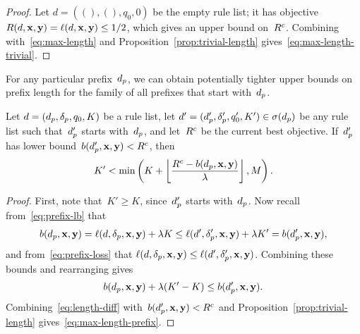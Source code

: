 \begin{arxiv}
\begin{proof}
Let ${d = ((), (), q_0, 0)}$ be the empty rule list;
it has objective ${R({d}, \mathbf{x}, \mathbf{y}) = \ell({d}, \mathbf{x}, \mathbf{y}) \le 1/2}$,
which gives an upper bound on~${R^c}$.
%
Combining with~\eqref{eq:max-length}
and Proposition~\ref{prop:trivial-length}
gives~\eqref{eq:max-length-trivial}.
\end{proof}
\end{arxiv}

For any particular prefix~$d_p$, we can obtain potentially tighter upper bounds on
prefix length for the family of all prefixes that start with~$d_p$.

%

\begin{theorem}
\label{thm:ub-prefix-specific}
Let ${{d} = (d_p, \delta_p, q_0, K)}$ be a rule list, let
${{d}' = (d_p', \delta_p', q_0', K') \in \sigma(d_p)}$
be any rule list such that~$d_p'$ starts with~$d_p$,
and let~${R^c}$ be the current best objective.
%
If~$d_p'$ has lower bound~${b(d_p', \mathbf{x}, \mathbf{y}) < {R^c}}$, then
\begin{align}
K' < \min \left( K + \left\lfloor \frac{\CurrentObj - b(\Prefix, \x, \y)}{\Reg} \right\rfloor, M \right).
\label{eq:max-length-prefix}
\end{align}
\end{theorem}

\begin{arxiv}
\begin{proof}
First, note that~${K' \ge K}$, since~$d_p'$ starts with~$d_p$.
%
Now recall from~\eqref{eq:prefix-lb} that
%
\begin{align}
b(\Prefix, \x, \y) = \Loss(\RL, \Labels, \x, \y) + \Reg K
\le \Loss(\RL', \Labels', \x, \y) + \Reg K' = b(\Prefix', \x, \y),
\end{align}
%
and from~\eqref{eq:prefix-loss} that
${\ell({d}, \delta_p, \mathbf{x}, \mathbf{y}) \le \ell({d}', \delta_p', \mathbf{x}, \mathbf{y})}$.
%
Combining these bounds and rearranging gives
\begin{align}
b(\Prefix, \x, \y) + \Reg (K' - K) \le b(\Prefix', \x, \y).
\label{eq:length-diff}
\end{align}
Combining~\eqref{eq:length-diff} with~${b(d_p', \mathbf{x}, \mathbf{y}) < {R^c}}$
and Proposition~\ref{prop:trivial-length} gives~\eqref{eq:max-length-prefix}.
\end{proof}
\end{arxiv}

